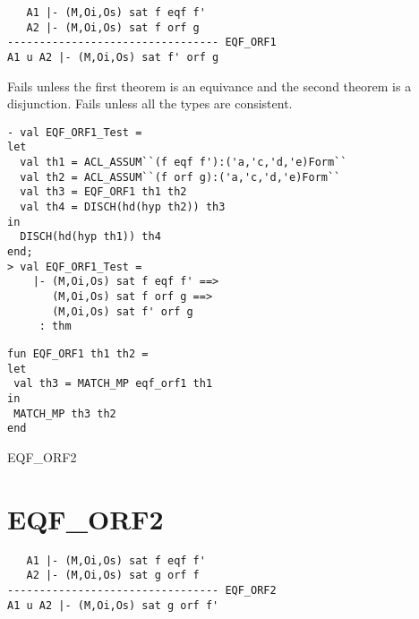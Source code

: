 

\egroup

\DESCRIBE
\begin{verbatim}
   A1 |- (M,Oi,Os) sat f eqf f'
   A2 |- (M,Oi,Os) sat f orf g
--------------------------------- EQF_ORF1
A1 u A2 |- (M,Oi,Os) sat f' orf g
\end{verbatim}

\FAILURE
Fails unless the first theorem is an equivance and the second theorem
is a disjunction. Fails unless all the types are consistent.

\EXAMPLE
\begin{holboxed}
\begin{verbatim}
- val EQF_ORF1_Test =
let
  val th1 = ACL_ASSUM``(f eqf f'):('a,'c,'d,'e)Form``
  val th2 = ACL_ASSUM``(f orf g):('a,'c,'d,'e)Form``
  val th3 = EQF_ORF1 th1 th2
  val th4 = DISCH(hd(hyp th2)) th3
in
  DISCH(hd(hyp th1)) th4
end;
> val EQF_ORF1_Test =
    |- (M,Oi,Os) sat f eqf f' ==>
       (M,Oi,Os) sat f orf g ==>
       (M,Oi,Os) sat f' orf g
     : thm
\end{verbatim}
\end{holboxed}

\IMPLEMENTATION
\begin{holboxed}
\begin{verbatim}
fun EQF_ORF1 th1 th2 =
let
 val th3 = MATCH_MP eqf_orf1 th1
in
 MATCH_MP th3 th2
end
\end{verbatim}
\end{holboxed}

\SEEALSO
EQF\_ORF2

\ENDDOC

\section{EQF\_ORF2}



\egroup

\DESCRIBE
\begin{verbatim}
   A1 |- (M,Oi,Os) sat f eqf f'
   A2 |- (M,Oi,Os) sat g orf f
--------------------------------- EQF_ORF2
A1 u A2 |- (M,Oi,Os) sat g orf f'
\end{verbatim}


